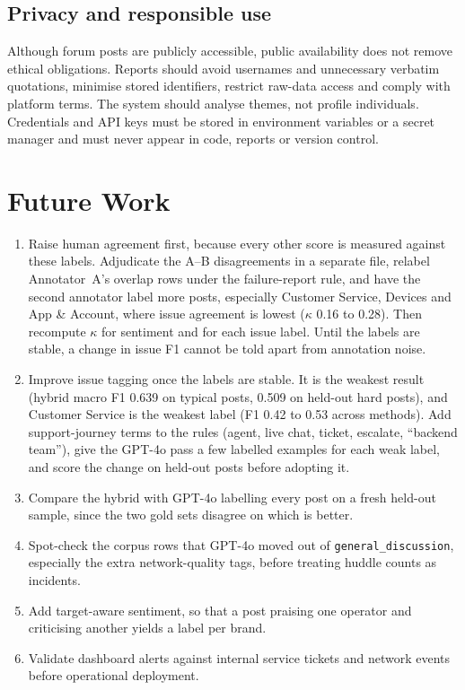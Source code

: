 \documentclass[11pt,a4paper]{article}
\begin{document}
\subsection{Privacy and responsible use}

Although forum posts are publicly accessible, public availability does not remove ethical obligations. Reports should avoid usernames and unnecessary verbatim quotations, minimise stored identifiers, restrict raw-data access and comply with platform terms. The system should analyse themes, not profile individuals. Credentials and API keys must be stored in environment variables or a secret manager and must never appear in code, reports or version control.

\section{Future Work}
\label{sec:future}

\begin{enumerate}
  \item Raise human agreement first, because every other score is measured against these labels. Adjudicate the A--B disagreements in a separate file, relabel Annotator~A's overlap rows under the failure-report rule, and have the second annotator label more posts, especially Customer Service, Devices and App \& Account, where issue agreement is lowest ($\kappa$ 0.16 to 0.28). Then recompute $\kappa$ for sentiment and for each issue label. Until the labels are stable, a change in issue F1 cannot be told apart from annotation noise.
  \item Improve issue tagging once the labels are stable. It is the weakest result (hybrid macro F1 0.639 on typical posts, 0.509 on held-out hard posts), and Customer Service is the weakest label (F1 0.42 to 0.53 across methods). Add support-journey terms to the rules (agent, live chat, ticket, escalate, ``backend team''), give the GPT-4o pass a few labelled examples for each weak label, and score the change on held-out posts before adopting it.
  \item Compare the hybrid with GPT-4o labelling every post on a fresh held-out sample, since the two gold sets disagree on which is better.
  \item Spot-check the corpus rows that GPT-4o moved out of \texttt{general\_discussion}, especially the extra network-quality tags, before treating huddle counts as incidents.
  \item Add target-aware sentiment, so that a post praising one operator and criticising another yields a label per brand.
  \item Validate dashboard alerts against internal service tickets and network events before operational deployment.
\end{enumerate}
\end{document}

